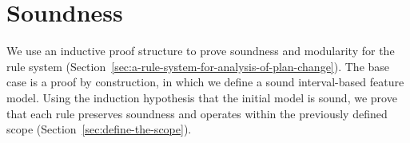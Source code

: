 \chapter{Soundness}
\label{cha:soundness}



We use an inductive proof structure to prove soundness and modularity for the rule system (Section~\vref{sec:a-rule-system-for-analysis-of-plan-change}). The base case is a proof by construction, in which we define a sound interval-based feature model. Using the induction hypothesis that the initial model is sound, we prove that each rule preserves soundness and operates within the previously defined scope (Section~\vref{sec:define-the-scope}).






















